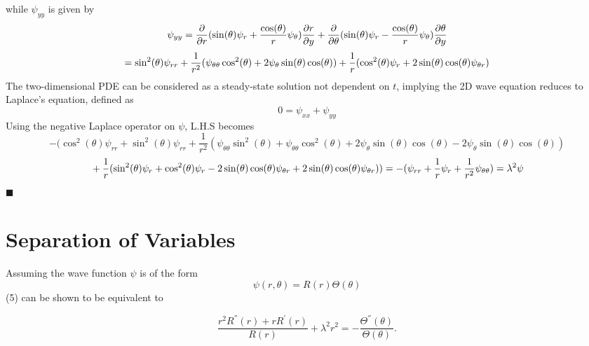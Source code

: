 \documentclass{article}
\begin{document}
while $\psi_{yy}$ is given by
\begin{equation*}
\psi_{yy}=\frac{\partial}{\partial r}(\sin(\theta)\psi_r +\frac{\cos(\theta)}{r}\psi_{\theta})\frac{\partial r}{\partial y} \newline + \frac{\partial}{\partial \theta}(\sin(\theta)\psi_r -\frac{\cos(\theta)}{r}\psi_{\theta})\frac{\partial \theta}{\partial y} 
\end{equation*}\begin{equation*}
= \sin^2(\theta)\psi_{rr}+\frac{1}{r^2}(\psi_{\theta \theta} \cos^2 (\theta)+2 \psi_{ \theta} \sin(\theta)\cos(\theta))\newline +\frac{1}{r}(\cos^2(\theta)\psi_r +2\sin(\theta)\cos(\theta)\psi_{\theta r})
\end{equation*}
The two-dimensional PDE can be considered as a steady-state solution not dependent on $t$, implying the 2D wave equation reduces to Laplace's equation, defined as 
\begin{equation*}
0 = \psi_{xx}+\psi_{yy}
\end{equation*}Using the negative Laplace operator on $\psi$, L.H.S becomes
\begin{equation*}
-(\cos^2(\theta)\psi_{rr}+\sin^2(\theta)\psi_{rr}+\frac{1}{r^2}(\psi_{\theta \theta} \sin^2 (\theta)+\psi_{\theta \theta} \cos^2 (\theta)+2 \psi_{ \theta} \sin(\theta)\cos(\theta)-2 \psi_{ \theta} \sin(\theta)\cos(\theta))
\end{equation*}\begin{equation*}
	\newline +\frac{1}{r}(\sin^2(\theta)\psi_r+\cos^2(\theta)\psi_r -2\sin(\theta)\cos(\theta)\psi_{\theta r} +2\sin(\theta)\cos(\theta)\psi_{\theta r})) \newline = -(\psi_{rr}+\frac{1}{r}\psi_r + \frac{1}{r^2}\psi_{\theta \theta})=\lambda^2 \psi
\end{equation*}$\blacksquare$ 

\section{Separation of Variables}
Assuming the wave function $\psi$ is of the form
\begin{equation*}
    \psi(r,\theta)=R(r)\Theta(\theta)
\end{equation*}
(5) can be shown to be equivalent to 

\begin{equation*}
\frac{r^2 R^{''}(r)+rR^{'}(r)}{R(r)}+\lambda^{2}r^2=-\frac{\Theta^{''}(\theta)}{\Theta(\theta)}.
\end{equation*}
\end{document}
